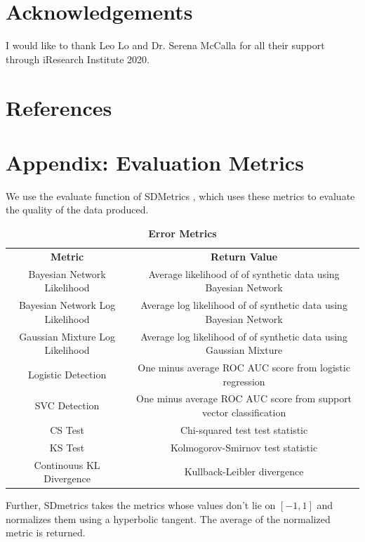 \documentclass[11pt]{article}
\begin{document}
\newpage

\section{Acknowledgements}
I would like to thank Leo Lo and Dr. Serena McCalla for all their support through iResearch Institute 2020.

\section{References}

\printbibliography[heading = none]

\appendix
\section{Appendix: Evaluation Metrics}
\label{appendix:Metrics}
We use the evaluate function of SDMetrics \cite{patki_wedge_veeramachaneni_2016}, which uses these metrics to evaluate the quality of the data produced.

\begin{table}[h]
    \caption{\textbf{Error Metrics}}
    \begin{center}
        \begin{tabular}{ c c }
            \textbf{Metric} & \textbf{Return Value} \\
            Bayesian Network Likelihood & Average likelihood of of synthetic data using Bayesian Network \\
            Bayesian Network Log Likelihood & Average log likelihood of of synthetic data using Bayesian Network \\
            Gaussian Mixture Log Likelihood & Average log likelihood of of synthetic data using Gaussian Mixture \\
            Logistic Detection & One minus average ROC AUC score from logistic regression \\
            SVC Detection & One minus average ROC AUC score from support vector classification \\
            CS Test & Chi-squared test test statistic \\
            KS Test & Kolmogorov-Smirnov test statistic \\
            Continouus KL Divergence & Kullback-Leibler divergence \\
        \end{tabular}
    \end{center}
\end{table}
Further, SDmetrics takes the metrics whose values don't lie on $[-1, 1]$ and normalizes them using a hyperbolic tangent. The average of the normalized metric is returned.
\end{document}
